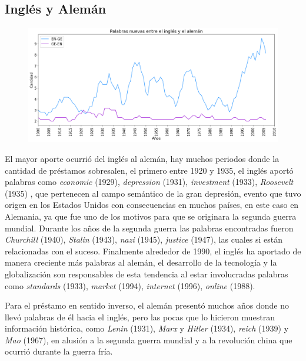 \newpage


\subsection{Inglés y Alemán}


\begin{figure}[h!]
	\centering
	\includegraphics[scale=.38]{Cap_2/NC_2_S2_EN.png}
	\label{NC_EG}
	\caption{}
\end{figure}


El mayor aporte ocurrió del inglés al alemán, hay muchos periodos donde la cantidad de préstamos sobresalen, el primero entre 1920 y 1935,  el inglés aportó  palabras como \textit{economic} (1929), \textit{depression} (1931),  \textit{investment} (1933), \textit{Roosevelt} (1935) , que pertenecen al campo semántico de la gran depresión, evento que tuvo origen en los Estados Unidos  con consecuencias en muchos países, en este caso en Alemania, ya que fue uno de los motivos para que se originara la segunda guerra mundial.  Durante los años de la segunda guerra las palabras encontradas fueron \textit{Churchill} (1940), \textit{Stalin} (1943), \textit{nazi} (1945),  \textit{justice} (1947),  las cuales si están relacionadas con el suceso.  Finalmente alrededor de 1990, el inglés ha aportado de manera creciente más palabras al alemán, el desarrollo de la tecnología y la globalización son responsables de esta tendencia al estar involucradas palabras como \textit{standards} (1933), \textit{market} (1994),  \textit{internet} (1996), \textit{online} (1988). 

Para el préstamo en sentido inverso, el alemán presentó muchos años donde no llevó palabras de él hacia el inglés,  pero las pocas que lo hicieron muestran información histórica, como \textit{Lenin} (1931), \textit{Marx} y \textit{Hitler} (1934),  \textit{reich} (1939) y  \textit{Mao} (1967),  en alusión a la segunda guerra mundial y a la revolución china que ocurrió durante la guerra fría.

